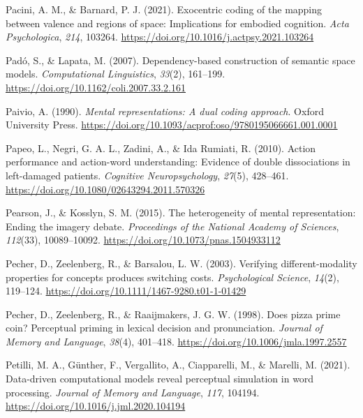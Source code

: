 \documentclass[
  12pt,
  man,floatsintext]{apa7}
\newlength{\cslhangindent}
\newlength{\cslentryspacingunit} %
\newenvironment{CSLReferences}[2] %
 {%
  \setlength{\parindent}{0pt}
  \ifodd #1
  \let\oldpar\par
  \def\par{\hangindent=\cslhangindent\oldpar}
  \fi
  \setlength{\parskip}{#2\cslentryspacingunit}
 }%
 {}
\begin{document}
\begin{CSLReferences}{1}{0}
\leavevmode{}%
Pacini, A. M., \& Barnard, P. J. (2021). Exocentric coding of the mapping between valence and regions of space: {Implications} for embodied cognition. \emph{Acta Psychologica}, \emph{214}, 103264. \url{https://doi.org/10.1016/j.actpsy.2021.103264}

\leavevmode{}%
Padó, S., \& Lapata, M. (2007). Dependency-based construction of semantic space models. \emph{Computational Linguistics}, \emph{33}(2), 161--199. \url{https://doi.org/10.1162/coli.2007.33.2.161}

\leavevmode{}%
Paivio, A. (1990). \emph{Mental representations: A dual coding approach}. {Oxford University Press}. \url{https://doi.org/10.1093/acprof:oso/9780195066661.001.0001}

\leavevmode{}%
Papeo, L., Negri, G. A. L., Zadini, A., \& Ida Rumiati, R. (2010). Action performance and action-word understanding: {Evidence} of double dissociations in left-damaged patients. \emph{Cognitive Neuropsychology}, \emph{27}(5), 428--461. \url{https://doi.org/10.1080/02643294.2011.570326}

\leavevmode{}%
Pearson, J., \& Kosslyn, S. M. (2015). The heterogeneity of mental representation: {Ending} the imagery debate. \emph{Proceedings of the National Academy of Sciences}, \emph{112}(33), 10089--10092. \url{https://doi.org/10.1073/pnas.1504933112}

\leavevmode{}%
Pecher, D., Zeelenberg, R., \& Barsalou, L. W. (2003). Verifying different-modality properties for concepts produces switching costs. \emph{Psychological Science}, \emph{14}(2), 119--124. \url{https://doi.org/10.1111/1467-9280.t01-1-01429}

\leavevmode{}%
Pecher, D., Zeelenberg, R., \& Raaijmakers, J. G. W. (1998). Does pizza prime coin? {Perceptual} priming in lexical decision and pronunciation. \emph{Journal of Memory and Language}, \emph{38}(4), 401--418. \url{https://doi.org/10.1006/jmla.1997.2557}

\leavevmode{}%
Petilli, M. A., Günther, F., Vergallito, A., Ciapparelli, M., \& Marelli, M. (2021). Data-driven computational models reveal perceptual simulation in word processing. \emph{Journal of Memory and Language}, \emph{117}, 104194. \url{https://doi.org/10.1016/j.jml.2020.104194}


\end{CSLReferences}
\end{document}
